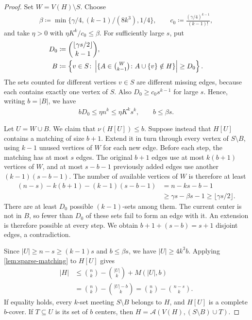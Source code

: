 \begin{proof}
Set $W=V(H)\setminus S$. Choose
\begin{align*}
\beta\coloneqq\min\{\gamma/4,(k-1)/(8k^3),1/4\},
\qquad
c_0\coloneqq\frac{(\gamma/4)^{k-1}}{(k-1)!},
\end{align*}
and take $\eta>0$ with $\eta K^k/c_0\le\beta$. For sufficiently large $s$, put
\begin{align*}
D_0&\coloneqq\binom{\lfloor\gamma s/2\rfloor}{k-1},\\
B&\coloneqq\left\{v\in S\colon
\left|\{A\in\tbinom W{k-1}\colon A\cup\{v\}\notin H\}\right|\ge D_0\right\}.
\end{align*}
The sets counted for different vertices $v\in S$ are different missing edges, because each contains exactly one vertex of $S$. Also $D_0\ge c_0s^{k-1}$ for large $s$. Hence, writing $b=|B|$, we have
\begin{align*}
bD_0\le\eta n^k\le\eta K^ks^k,
\qquad b\le\beta s.
\end{align*}

Let $U=W\cup B$. We claim that $\nu(H[U])\le b$. Suppose instead that $H[U]$ contains a matching of size $b+1$. Extend it in turn through every vertex of $S\setminus B$, using $k-1$ unused vertices of $W$ for each new edge. Before each step, the matching has at most $s$ edges. The original $b+1$ edges use at most $k(b+1)$ vertices of $W$, and at most $s-b-1$ previously added edges use another $(k-1)(s-b-1)$. The number of available vertices of $W$ is therefore at least
\begin{align*}
(n-s)-k(b+1)-(k-1)(s-b-1)
&=n-ks-b-1\\
&\ge\gamma s-\beta s-1\ge\lfloor\gamma s/2\rfloor.
\end{align*}
There are at least $D_0$ possible $(k-1)$-sets among them. The current center is not in $B$, so fewer than $D_0$ of these sets fail to form an edge with it. An extension is therefore possible at every step. We obtain $b+1+(s-b)=s+1$ disjoint edges, a contradiction.

Since $|U|\ge n-s\ge(k-1)s$ and $b\le\beta s$, we have $|U|\ge4k^3b$. Applying \cref{lem:sparse-matching} to $H[U]$ gives
\begin{align*}
|H|&\le\binom nk-\binom{|U|}k+M(|U|,b)\\
&=\binom nk-\binom{|U|-b}k
=\binom nk-\binom{n-s}k.
\end{align*}
If equality holds, every $k$-set meeting $S\setminus B$ belongs to $H$, and $H[U]$ is a complete $b$-cover. If $T\subseteq U$ is its set of $b$ centers, then $H=\mathcal A(V(H),(S\setminus B)\cup T)$.
\end{proof}


